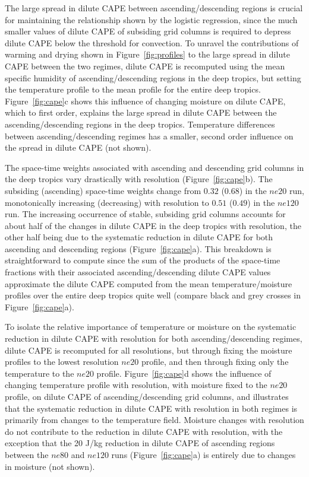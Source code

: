 \documentclass[times]{qjrms4}
\begin{document}
The large spread in dilute CAPE between ascending/descending regions is crucial for maintaining the relationship shown by the logistic regression, since the much smaller values of dilute CAPE of subsiding grid columns is required to depress dilute CAPE below the threshold for convection. To unravel the contributions of warming and drying shown in Figure~\ref{fig:profiles} to the large spread in dilute CAPE between the two regimes, dilute CAPE is recomputed using the mean specific humidity of ascending/descending regions in the deep tropics, but setting the temperature profile to the mean profile for the entire deep tropics. Figure~\ref{fig:cape}c shows this influence of changing moisture on dilute CAPE, which to first order, explains the large spread in dilute CAPE between the ascending/descending regions in the deep tropics. Temperature differences between ascending/descending regimes has a smaller, second order influence on the spread in dilute CAPE (not shown).

The space-time weights associated with ascending and descending grid columns in the deep tropics vary drastically with resolution (Figure~\ref{fig:cape}b). The subsiding (ascending) space-time weights change from $0.32$ ($0.68$) in the $ne20$ run, monotonically increasing (decreasing) with resolution to $0.51$ ($0.49$) in the $ne120$ run. The increasing occurrence of stable, subsiding grid columns accounts for about half of the changes in dilute CAPE in the deep tropics with resolution, the other half being due to the systematic reduction in dilute CAPE for both ascending and descending regions (Figure~\ref{fig:cape}a). This breakdown is straightforward to compute since the sum of the products of the space-time fractions with their associated ascending/descending dilute CAPE values approximate the dilute CAPE computed from the mean temperature/moisture profiles over the entire deep tropics quite well (compare black and grey crosses in Figure~\ref{fig:cape}a). 

To isolate the relative importance of temperature or moisture on the systematic reduction in dilute CAPE with resolution for both ascending/descending regimes, dilute CAPE is recomputed for all resolutions, but through fixing the moisture profiles to the lowest resolution $ne20$ profile, and then through fixing only the temperature to the $ne20$ profile. Figure~\ref{fig:cape}d shows the influence of changing temperature profile with resolution, with moisture fixed to the $ne20$ profile, on dilute CAPE of ascending/descending grid columns, and illustrates that the systematic reduction in dilute CAPE with resolution in both regimes is primarily from changes to the temperature field. Moisture changes with resolution do not contribute to the reduction in dilute CAPE with resolution, with the exception that the 20 J/kg reduction in dilute CAPE of ascending regions between the $ne80$ and $ne120$ runs (Figure~\ref{fig:cape}a) is entirely due to changes in moisture (not shown).
\end{document}
